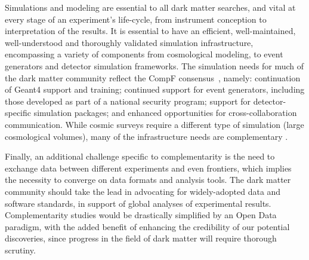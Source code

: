 \documentclass[nofootinbib]{article}
\begin{document}
Simulations and modeling are essential to all dark matter searches, and vital at every stage of an experiment's life-cycle, from instrument conception to interpretation of the results. It is essential to have an efficient, well-maintained, well-understood and thoroughly validated simulation infrastructure, encompassing a variety of components from cosmological modeling, to event generators and detector simulation frameworks. The simulation needs for much of the dark matter community reflect the CompF consensus~\cite{CompF-Report}, namely: continuation of Geant4 support and training; continued support for event generators, including those developed as part of a national security program; support for detector-specific simulation packages; and enhanced opportunities for cross-collaboration communication. While cosmic surveys require a different type of simulation (large cosmological volumes), many of the infrastructure needs are complementary \cite{Banerjee:2022qcb,Alvarez:2022rbk}. 

Finally, an additional challenge specific to complementarity is the need to exchange data between different experiments and even frontiers, which implies the necessity to converge on data formats and analysis tools. The dark matter community should take the lead in advocating for widely-adopted data and software standards, in support of global analyses of experimental results. Complementarity studies would be drastically simplified by an Open Data paradigm, with the added benefit of enhancing the credibility of our potential discoveries, since progress in the field of dark matter will require thorough scrutiny.

\end{document}
